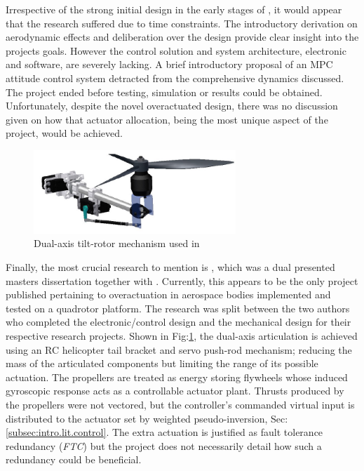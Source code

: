 \par
Irrespective of the strong initial design in the early stages of \cite{napsholm}, it would appear that the research suffered due to time constraints. The introductory derivation on aerodynamic effects and deliberation over the design provide clear insight into the projects goals. However the control solution and system architecture, electronic and software, are severely lacking. A brief introductory proposal of an MPC attitude control system detracted from the comprehensive dynamics discussed. The project ended before testing, simulation or results could be obtained. Unfortunately, despite the novel overactuated design, there was no discussion given on how that actuator allocation, being the most unique aspect of the project, would be achieved.
\par
\begin{figure}[htbp]
\vspace{-12pt}
\centering
\includegraphics[width=0.68\textwidth]{figs/gasco-mech}
\vspace{-14pt}
\caption{Dual-axis tilt-rotor mechanism used in \cite{tiltgasco}}
\label{fig:tiltrotor-gasco}
\vspace{-10pt}
\end{figure}
Finally, the most crucial research to mention is \cite{tiltgasco}, which was a dual presented masters dissertation together with \cite{tiltrihani}. Currently, this appears to be the only project published pertaining to overactuation in aerospace bodies implemented and tested on a quadrotor platform. The research was split between the two authors who completed the electronic/control design and the mechanical design for their respective research projects. Shown in Fig:\ref{fig:tiltrotor-gasco}, the dual-axis articulation is achieved using an RC helicopter tail bracket and servo push-rod mechanism; reducing the mass of the articulated components but limiting the range of its possible actuation. The propellers are treated as energy storing flywheels whose induced gyroscopic response acts as a controllable actuator plant. Thrusts produced by the propellers were not vectored, but the controller's commanded virtual input is distributed to the actuator set by weighted pseudo-inversion, Sec:\ref{subsec:intro.lit.control}. The extra actuation is justified as fault tolerance redundancy (\emph{FTC}) but the project does not necessarily detail how such a redundancy could be beneficial.
